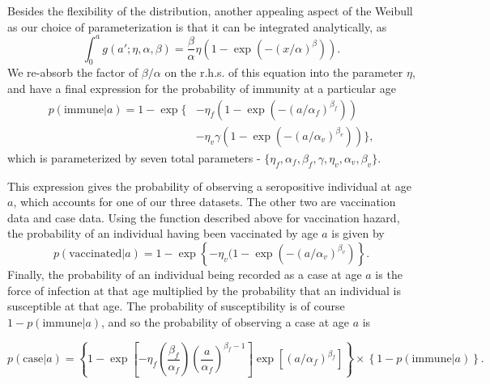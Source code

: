 \documentclass[nofootinbib,aps,pre,twocolumn,superscriptaddress,showkeys,showpacs]{revtex4-1}
\begin{document}
Besides the flexibility of the distribution, another appealing aspect of the Weibull as our choice of parameterization is that it can be integrated analytically, as
\begin{equation}
\int_0^a g(a';\eta,\alpha,\beta) = \frac{\beta}{\alpha} \eta \left( 1 - \exp(-(x/\alpha)^\beta) \right).
\end{equation}
We re-absorb the factor of $\beta/\alpha$ on the r.h.s. of this equation into the parameter $\eta$, and have a final expression for the probability of immunity at a particular age
\begin{align}
p(\mathrm{immune}|a) = 1 - \exp\big\{&-\eta_f\left(1-\exp(-(a/\alpha_f)^{\beta_f})\right)  \nonumber \\ 
&-\eta_v \gamma \left(1-\exp(-(a/\alpha_v)^{\beta_v}) \right)  \big\},
\end{align}
which is parameterized by seven total parameters - $\{\eta_f, \alpha_f, \beta_f, \gamma, \eta_v, \alpha_v, \beta_v\}$.

This expression gives the probability of observing a seropositive individual at age $a$, which accounts for one of our three datasets. The other two are vaccination data and case data. Using the function described above for vaccination hazard, the probability of an individual having been vaccinated by age $a$ is given by
\begin{equation}
p(\mathrm{vaccinated}|a) = 1 - \exp \left\{ - \eta_v (1-\exp\left(-(a/\alpha_v)^{\beta_v}\right) \right\}.
\end{equation}
Finally, the probability of an individual being recorded as a case at age $a$ is the force of infection at that age multiplied by the probability that an individual is susceptible at that age. The probability of susceptibility is of course $1 - p(\mathrm{immune}|a)$, and so the probability of observing a case at age $a$ is
\begin{widetext}
\begin{equation}
p(\mathrm{case}|a) = \left\{ 1 - \exp\left[ -\eta_f \left( \frac{\beta_f}{\alpha_f}\right)\left(\frac{a}{\alpha_f}\right)^{\beta_f - 1}\right] \exp\left[ (a/\alpha_f)^{\beta_f}\right] \right\}
\times \left\{ 1-p(\mathrm{immune}|a)\right\}.
\end{equation}
\end{widetext}
\end{document}
